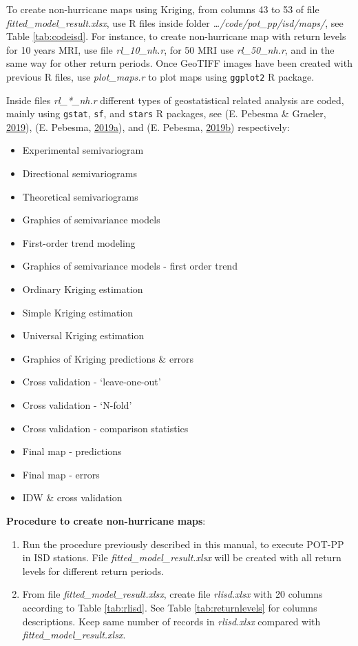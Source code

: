 \documentclass[12pt,twoside]{reedthesis}
\providecommand{\tightlist}{%
  \setlength{\itemsep}{0pt}\setlength{\parskip}{0pt}}
\begin{document}
To create non-hurricane maps using Kriging, from columns 43 to 53 of file \emph{fitted\_model\_result.xlsx}, use R files inside folder \emph{\ldots/code/pot\_pp/isd/maps/}, see Table \ref{tab:codeisd}. For instance, to create non-hurricane map with return levels for 10 years MRI, use file \emph{rl\_10\_nh.r}, for 50 MRI use \emph{rl\_50\_nh.r}, and in the same way for other return periods. Once GeoTIFF images have been created with previous R files, use \emph{plot\_maps.r} to plot maps using \texttt{ggplot2} R package.

Inside files \emph{rl\_*\_nh.r} different types of geostatistical related analysis are coded, mainly using \texttt{gstat}, \texttt{sf}, and \texttt{stars} R packages, see (E. Pebesma \& Graeler, \protect\hyperlink{ref-Pebesma2019}{2019}), (E. Pebesma, \protect\hyperlink{ref-Pebesma2019a}{2019}\protect\hyperlink{ref-Pebesma2019a}{a}), and (E. Pebesma, \protect\hyperlink{ref-Pebesma2019b}{2019}\protect\hyperlink{ref-Pebesma2019b}{b}) respectively:
\begin{itemize}
\tightlist
\item
  Experimental semivariogram
\item
  Directional semivariograms
\item
  Theoretical semivariograms
\item
  Graphics of semivariance models
\item
  First-order trend modeling
\item
  Graphics of semivariance models - first order trend
\item
  Ordinary Kriging estimation
\item
  Simple Kriging estimation
\item
  Universal Kriging estimation
\item
  Graphics of Kriging predictions \& errors
\item
  Cross validation - `leave-one-out'
\item
  Cross validation - `N-fold'
\item
  Cross validation - comparison statistics
\item
  Final map - predictions
\item
  Final map - errors
\item
  IDW \& cross validation
\end{itemize}
\textbf{Procedure to create non-hurricane maps}:
\begin{enumerate}
\def\labelenumi{\arabic{enumi}.}
\item
  Run the procedure previously described in this manual, to execute POT-PP in ISD stations. File \emph{fitted\_model\_result.xlsx} will be created with all return levels for different return periods.
\item
  From file \emph{fitted\_model\_result.xlsx}, create file \emph{rlisd.xlsx} with 20 columns according to Table \ref{tab:rlisd}. See Table \ref{tab:returnlevels} for columns descriptions. Keep same number of records in \emph{rlisd.xlsx} compared with \emph{fitted\_model\_result.xlsx}.
\end{enumerate}
\end{document}

